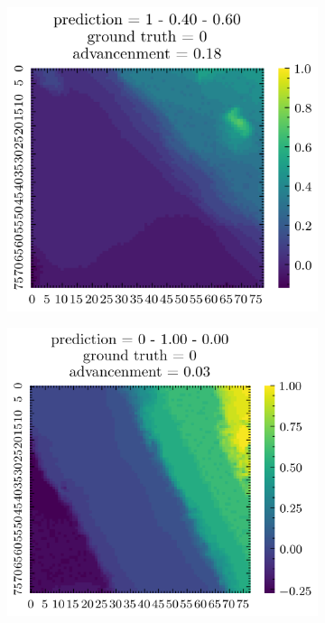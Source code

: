 \begin{figure}[H]
    \centering
    \begin{subfigure}[b]{0.19\textwidth}
        \includegraphics[width=\linewidth]{../img/5/quarry/worst/patch-2d-0.png}
    \end{subfigure}
    \begin{subfigure}[b]{0.19\textwidth}
        \includegraphics[width=\linewidth]{../img/5/quarry/worst/patch-2d-1.png}

\end{subfigure}
\end{figure}

